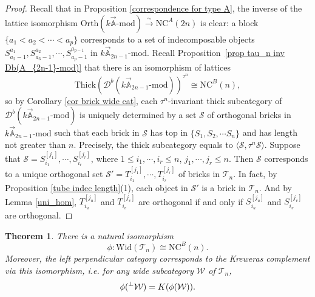 \documentclass[a4paper, 11pt, reqno]{amsart}
\numberwithin{equation}{section}
\newtheorem{thm}{Theorem}[section]
\theoremstyle{remark}
\theoremstyle{definition}
\begin{document}
\begin{proof}
   Recall that in Proposition \ref{correspondence for type A}, the inverse of the lattice isomorphism $\mathrm{Orth}(k \vec{\mathbb A} \text{-} \mathrm{mod}) \xrightarrow{\sim} \mathrm{NC}^A(2n)$ is clear: a block $\{a_1<a_2< \cdots <a_p \}$ corresponds to a set of indecomposable objects $S^{a_1}_{a_2-1},S^{a_2}_{a_3-1},\cdots,S^{a_{p-1}}_{a_p-1}$ in $k \vec{\mathbb A}_{2n-1} \text{-mod}$. Recall Proposition~\ref{prop tau_n inv Db(A_{2n-1}-mod)} that there is an isomorphism of lattices 
   \[
      \mathrm{Thick}(\mathcal D^b(k \vec{\mathbb A}_{2n-1} \text{-} \mathrm{mod}))^{\tau ^n} \cong \mathrm{NC}^B(n),
   \]
   so by Corollary \ref{cor brick wide cat}, each $\tau^n$-invariant thick subcategory of $\mathcal D^b(k \vec{\mathbb A}_{2n-1} \text{-} \mathrm{mod})$ is uniquely determined by a set $\mathcal S$ of orthogonal bricks in $k \vec{\mathbb A}_{2n-1} \text{-} \mathrm{mod}$ such that each brick in $\mathcal S$ has top in $\{S_1,S_2,\cdots S_n \}$ and has length not greater than $n$. Precisely, the thick subcategory equals to $\langle \mathcal S, \tau^n \mathcal S \rangle$. Suppose that $\mathcal S=S_{i_1}^{[j_1]},\cdots,S_{i_r}^{[j_r]}$, where $1\leq i_1,\cdots,i_r\leq n$, $j_1,\cdots, j_r \leq n$. Then $\mathcal S$ corresponds to a unique orthogonal set $\mathcal S'=T_{i_1}^{[j_1]},\cdots,T_{i_r}^{[j_r]}$ of bricks in $\mathcal T_n$. In fact, by Proposition \ref{tube indec length}(1), each object in $\mathcal S'$ is a brick in $\mathcal T_n$. And by Lemma \ref{uni_hom}, $T_{i_u}^{[j_u]}$ and $T_{i_v}^{[j_v]}$ are orthogonal if and only if $S_{i_u}^{[j_u]}$ and $S_{i_v}^{[j_v]}$ are orthogonal.
\end{proof}

\begin{thm} \label{thm tube B}
   There is a natural isomorphism
   \[
   \phi: \mathrm{Wid}(\mathcal T_n) \cong \mathrm{NC}^B(n).
   \]
   Moreover, the left perpendicular category corresponds to the Kreweras complement via this isomorphism, i.e. for any wide subcategory $\mathcal W$ of $\mathcal T_n$,
   \[
   \phi(\prescript{\perp}{}{\mathcal W})=K(\phi(\mathcal W)).
   \]
\end{thm}
\end{document}
